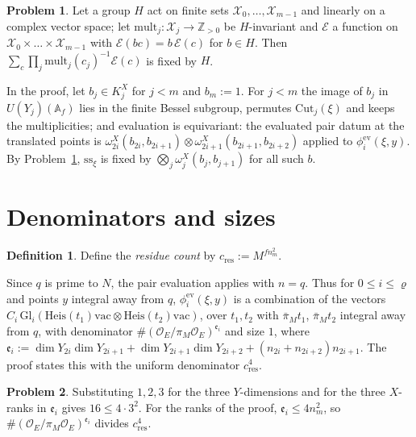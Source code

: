\documentclass[reqno]{amsart}
\theoremstyle{definition}
\newtheorem{problem}{Problem}[section]
\newtheorem{definition}{Definition}[section]
\theoremstyle{plain}
\newcommand{\Z}{\mathbb{Z}}
\newcommand{\Oc}{\mathcal{O}}
\newcommand{\Heis}{\mathrm{Heis}}
\newcommand{\vac}{\mathrm{vac}}
\newcommand{\Gl}{\mathrm{Gl}}
\newcommand{\ssx}{\mathrm{ss}_\xi}
\newcommand{\Cut}{\mathrm{Cut}}
\newcommand{\mult}{\mathrm{mult}}
\newcommand{\ev}{\phi^{\mathrm{ev}}}
\newcommand{\cres}{c_{\mathrm{res}}}
\begin{document}
\begin{problem}\label{pr:joint}
Let a group \(H\) act on finite sets \(\mathcal X_0,\dots,\mathcal X_{m-1}\) and linearly on a complex vector space; let \(\mult_j\colon\mathcal X_j\to\Z_{>0}\) be \(H\)-invariant and \(\mathcal E\) a function on \(\mathcal X_0\times\dots\times\mathcal X_{m-1}\) with \(\mathcal E(bc)=b\,\mathcal E(c)\) for \(b\in H\).  Then \(\sum_c\prod_j\mult_j(c_j)^{-1}\mathcal E(c)\) is fixed by \(H\).
\end{problem}

In the proof, let \(b_j\in K^X_j\) for \(j<m\) and \(b_m:=1\).  For \(j<m\) the image of \(b_j\) in \(U(Y_j)(\mathbb A_f)\) lies in the finite Bessel subgroup, permutes \(\Cut_j(\xi)\) and keeps the multiplicities; and evaluation is equivariant: the evaluated pair datum at the translated points is \(\omega^X_{2i}(b_{2i},b_{2i+1})\otimes\omega^X_{2i+1}(b_{2i+1},b_{2i+2})\) applied to \(\ev_i(\xi,y)\).  By Problem~\ref{pr:joint}, \(\ssx\) is fixed by \(\bigotimes_j\omega^X_j(b_j,b_{j+1})\) for all such \(b\).

\section{Denominators and sizes}\label{sec:theorem}

\begin{definition}\label{def:cres}
Define the \emph{residue count} by \(\cres:=M^{fn_m^2}\).
\end{definition}

Since \(q\) is prime to \(N\), the pair evaluation applies with \(n=q\).  Thus for \(0\le i\le\varrho\) and points \(y\) integral away from \(q\), \(\ev_i(\xi,y)\) is a combination of the vectors \(C_i\,\Gl_i(\Heis(t_1)\vac\otimes\Heis(t_2)\vac)\), over \(t_1,t_2\) with \(\bar\pi_Mt_1\), \(\bar\pi_Mt_2\) integral away from \(q\), with denominator \(\#(\Oc_E/\pi_M\Oc_E)^{\mathfrak e_i}\) and size \(1\), where \(\mathfrak e_i:=\dim Y_{2i}\dim Y_{2i+1}+\dim Y_{2i+1}\dim Y_{2i+2}+(n_{2i}+n_{2i+2})n_{2i+1}\).  The proof states this with the uniform denominator \(\cres^4\).

\begin{problem}\label{pr:pair-exponent}
Substituting \(1,2,3\) for the three \(Y\)-dimensions and for the three \(X\)-ranks in \(\mathfrak e_i\) gives \(16\le4\cdot3^2\).  For the ranks of the proof, \(\mathfrak e_i\le4n_m^2\), so \(\#(\Oc_E/\pi_M\Oc_E)^{\mathfrak e_i}\) divides \(\cres^4\).
\end{problem}
\end{document}
